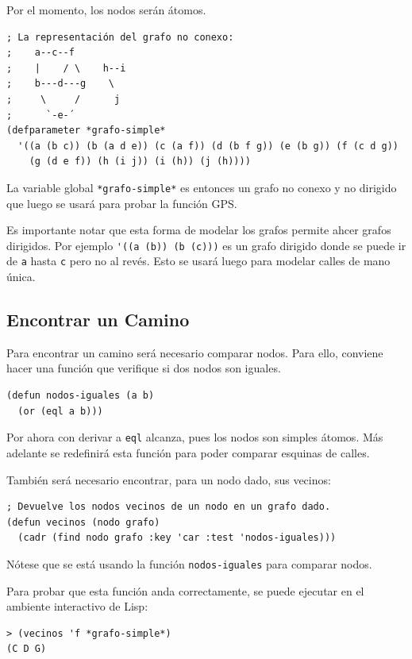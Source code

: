 \documentclass[12pt,titlepage]{article}
\begin{document}
Por el momento, los nodos serán átomos. 
\begin{lstlisting}
; La representación del grafo no conexo:
;    a--c--f     
;    |    / \    h--i
;    b---d---g    \
;     \     /      j
;      `-e-´
(defparameter *grafo-simple* 
  '((a (b c)) (b (a d e)) (c (a f)) (d (b f g)) (e (b g)) (f (c d g)) 
    (g (d e f)) (h (i j)) (i (h)) (j (h))))
\end{lstlisting}

La variable global \lstinline|*grafo-simple*| es entonces un grafo no conexo y no dirigido que luego se usará para probar la función GPS.

Es importante notar que esta forma de modelar los grafos permite ahcer grafos dirigidos. Por ejemplo \lstinline|'((a (b)) (b (c)))| es un grafo dirigido donde se puede ir de \lstinline|a| hasta \lstinline|c| pero no al revés. Esto se usará luego para modelar calles de mano única.

\subsection{Encontrar un Camino}

Para encontrar un camino será necesario comparar nodos. Para ello, conviene hacer una función que verifique si dos nodos son iguales.
\begin{lstlisting}
(defun nodos-iguales (a b)
  (or (eql a b)))
\end{lstlisting}
Por ahora con derivar a \lstinline|eql| alcanza, pues los nodos son simples átomos. Más adelante se redefinirá esta función para poder comparar esquinas de calles.

También será necesario encontrar, para un nodo dado, sus vecinos:
\begin{lstlisting}
; Devuelve los nodos vecinos de un nodo en un grafo dado.
(defun vecinos (nodo grafo)
  (cadr (find nodo grafo :key 'car :test 'nodos-iguales)))
\end{lstlisting}
Nótese que se está usando la función \lstinline|nodos-iguales| para comparar nodos.

Para probar que esta función anda correctamente, se puede ejecutar en el ambiente interactivo de Lisp:
\begin{lstlisting}
> (vecinos 'f *grafo-simple*)
(C D G)
\end{lstlisting}
\end{document}
